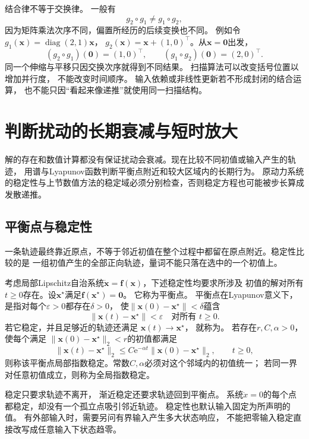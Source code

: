 结合律不等于交换律。 一般有
\[
	g_{2}\circ g_{1}\neq g_{1}\circ g_{2},
\]
因为矩阵乘法次序不同，偏置所经历的后续变换也不同。
例如令$g_1(\bm{x})=\operatorname{diag}(2,1)\bm{x}$，
$g_2(\bm{x})=\bm{x}+(1,0)^{\top}$。从$\bm{x}=\bm{0}$出发，
\[
	(g_2\circ g_1)(\bm{0})=(1,0)^{\top},\qquad
	(g_1\circ g_2)(\bm{0})=(2,0)^{\top}.
\]
同一个伸缩与平移只因交换次序就得到不同结果。
扫描算法可以改变括号位置以增加并行度， 不能改变时间顺序。
输入依赖或非线性更新若不形成封闭的结合运算，
也不能只因“看起来像递推”就使用同一扫描结构。

\section{判断扰动的长期衰减与短时放大}
\label{sec:dynamical-stability-sensitivity}

解的存在和数值计算都没有保证扰动会衰减。现在比较不同初值或输入产生的轨迹，
用谱与Lyapunov函数判断平衡点附近和较大区域内的长期行为。
原动力系统的稳定性与上节数值方法的稳定域必须分别检查，否则稳定方程也可能被步长算成发散递推。

\subsection{平衡点与稳定性}

一条轨迹最终靠近原点，不等于邻近初值在整个过程中都留在原点附近。稳定性比较的是
一组初值产生的全部正向轨迹，量词不能只落在选中的一个初值上。
\begin{definition}[平衡点与稳定性]
\label{def:dynamical-equilibrium-stability}
考虑局部Lipschitz自治系统$\dot{\bm{x}}=\bm{f}(\bm{x})$，下述稳定性均要求所涉及
初值的解对所有$t\geq0$存在。设$\bm{x}^{\star}$满足$\bm{f}(\bm{x}
^{\star})=\bm{0}$。 它称为平衡点。 平衡点在Lyapunov意义下， 是指对每个$\varepsilon
>0$都存在$\delta>0$， 使$\lVert\bm{x}(0)-\bm{x}^{\star}\rVert <\delta$蕴含
\[
	\lVert\bm{x}(t)-\bm{x}^{\star}\rVert<\varepsilon \quad\text{对所有 }t\geq0.
\]
若它稳定，并且足够近的轨迹还满足 $\bm{x}(t)\to\bm{x}^{\star}$， 就称为。
若存在$r,C,\alpha>0$，使每个满足
$\lVert\bm{x}(0)-\bm{x}^{\star}\rVert_2<r$的初值都满足
\[
	\lVert\bm{x}(t)-\bm{x}^{\star}\rVert_2
	\leq C\mathrm{e}^{-\alpha t}
	\lVert\bm{x}(0)-\bm{x}^{\star}\rVert_2,
	\qquad t\geq0,
\]
则称该平衡点局部指数稳定。常数$C,\alpha$必须对这个邻域内的初值统一；
若同一界对任意初值成立，则称为全局指数稳定。
\end{definition}

稳定只要求轨迹不离开， 渐近稳定还要求轨迹回到平衡点。 系统$\dot{x}=0$的每个点都稳定，却没有一个孤立点吸引邻近轨迹。
稳定性也默认输入固定为所声明的值。 有外部输入时，需要另问有界输入产生多大状态响应，
不能把零输入稳定直接改写成任意输入下状态趋零。

